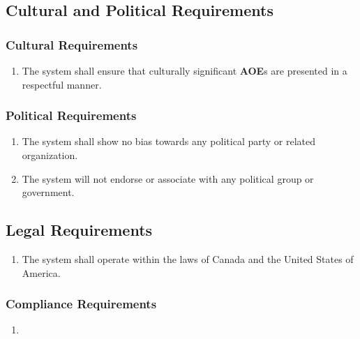 \documentclass[titlepage]{article}
\begin{document}
		
		\subsection{Cultural and Political Requirements}
		\label{sub:cultural_and_political_requirements}
		
		\subsubsection{Cultural Requirements}
		\label{ssub:cultural_requirements}
		\begin{enumerate}
			\item
			The system shall ensure that culturally significant \textbf{AOE}s are presented in a respectful manner.
		\end{enumerate}
		
		\subsubsection{Political Requirements}
		\label{ssub:political_requirements}
		\begin{enumerate}
			\item
			The system shall show no bias towards any political party or related organization.
			\item
			The system will not endorse or associate with any political group or government.
		\end{enumerate}
		
		\subsection{Legal Requirements}
		\label{sub:legal_requirements}
		\begin{enumerate}
			\item
			The system shall operate within the laws of Canada and the United States of America.
		\end{enumerate}
		
		\subsubsection{Compliance Requirements}
		\label{ssub:compliance_requirements}
		\begin{enumerate}[{LR}1. ]
			\item 
		\end{enumerate}
		
\end{document}
